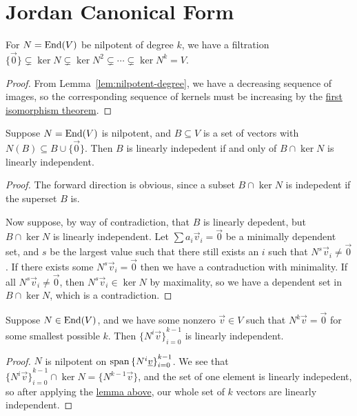 \section{Jordan Canonical Form}\label{sec:jcf}

\begin{lemma}
    For \(N = \operatorname{End}(V)\) be nilpotent of degree \(k\),
    we have a filtration
    \(\{\vec{0}\} \subsetneq \ker N \subsetneq \ker N^2 \subsetneq \cdots \subsetneq \ker N^k = V\).
\end{lemma}
\begin{proof}
    From Lemma~\ref{lem:nilpotent-degree},
    we have a decreasing sequence of images,
    so the corresponding sequence of kernels must be increasing
    by the \hyperref[thm:iso-1-vsp]{first isomorphism theorem}.
\end{proof}
\begin{lemma}\label{lem:nilpotent-lin-indep}
    Suppose \(N = \operatorname{End}(V)\) is nilpotent,
    and \(B \subseteq V\) is a set of vectors with \(N(B) \subseteq B \cup \{\vec{0}\}\).
    Then \(B\) is linearly indepedent if and only of \(B \cap \ker N\) is linearly independent.
\end{lemma}
\begin{proof}
    The forward direction is obvious,
    since a subset \(B \cap \ker N\) is indepedent if the superset \(B\) is.

    Now suppose, by way of contradiction,
    that \(B\) is linearly depedent, but \(B \cap \ker N\) is linearly independent.
    Let \(\sum a_i\vec{v}_i = \vec{0}\) be a minimally dependent set,
    and \(s\) be the largest value such that there still exists an \(i\) such that
    \(N^s\vec{v}_i \neq \vec{0}\).
    If there exists some \(N^s\vec{v}_i = \vec{0}\)
    then we have a contraduction with minimality.
    If all \(N^s\vec{v}_i \neq \vec{0}\),
    then \(N^s\vec{v}_i \in \ker N\) by maximality,
    so we have a dependent set in \(B \cap \ker N\), which is a contradiction.
\end{proof}
\begin{corollary}
    Suppose \(N \in \operatorname{End}(V)\), and we have some nonzero \(\vec{v} \in V\)
    such that \(N^k\vec{v} = \vec{0}\) for some smallest possible \(k\).
    Then \({\{N^i\vec{v}\}}_{i=0}^{k-1}\) is linearly independent.
\end{corollary}
\begin{proof}
    \(N\) is nilpotent on \(\operatorname{span}{\{N^i\underline{v}\}}_{i=0}^{k-1}\).
    We see that \({\{N^i\vec{v}\}}_{i=0}^{k-1} \cap \ker N = \{N^{k-1}\vec{v}\}\),
    and the set of one element is linearly indepedent,
    so after applying the \hyperref[lem:nilpotent-lin-indep]{lemma above},
    our whole set of \(k\) vectors are linearly independent.
\end{proof}

